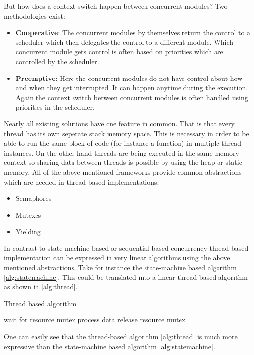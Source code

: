 But how does a context switch happen between concurrent modules? Two methodologies exist:

\begin{itemize}
\item \textbf{Cooperative}: The concurrent modules by themselves return the control to a scheduler which then delegates the control to a different module. Which concurrent module gets control is often based on priorities which are controlled by the scheduler.
\item \textbf{Preemptive}: Here the concurrent modules do not have control about how and when they get interrupted. It can happen anytime during the execution. Again the context switch between concurrent modules is often handled using priorities in the scheduler.
\end{itemize}

Nearly all existing solutions have one feature in common. That is that every thread has its own seperate stack memory space. This is necessary in order to be able to run the same block of code (for instance a function) in multiple thread instances. On the other hand threads are being executed in the same memory context so sharing data between threads is possible by using the heap or static memory. All of the above mentioned frameworks provide common abstractions which are needed in thread based implementations:

\begin{itemize}
\item Semaphores
\item Mutexes
\item Yielding
\end{itemize}

In contrast to state machine based or sequential based concurrency thread based implementation can be expressed in very linear algorithms using the above mentioned abstractions. Take for instance the state-machine based algorithm \ref{alg:statemachine}. This could be translated into a linear thread-based algorithm as shown in \ref{alg:thread}.

\begin{algorithm}[H]
\caption{Thread based algorithm}
\label{alg:thread}
\begin{algorithmic}
    \STATE wait for resource mutex
    \STATE process data
    \STATE release resource mutex
\ENDWHILE
\end{algorithmic}
\end{algorithm}

One can easily see that the thread-based algorithm \ref{alg:thread} is much more expressive than the state-machine based algorithm \ref{alg:statemachine}.

